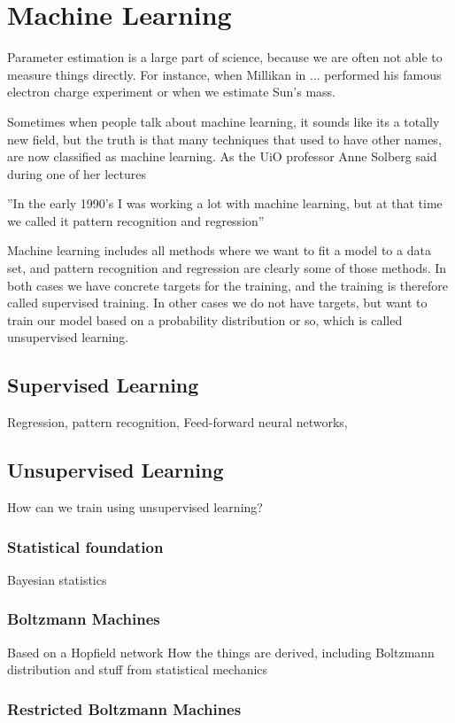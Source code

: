 \chapter{Machine Learning}
Parameter estimation is a large part of science, because we are often not able to measure things directly. For instance, when Millikan in ... performed his famous electron charge experiment or when we estimate Sun's mass. 

Sometimes when people talk about machine learning, it sounds like its a totally new field, but the truth is that many techniques that used to have other names, are now classified as machine learning. As the UiO professor Anne Solberg said during one of her lectures

''In the early 1990's I was working a lot with machine learning, but at that time we called it pattern recognition and regression''

Machine learning includes all methods where we want to fit a model to a data set, and pattern recognition and regression are clearly some of those methods. In both cases we have concrete targets for the training, and the training is therefore called supervised training. In other cases we do not have targets, but want to train our model based on a probability distribution or so, which is called unsupervised learning.

\section{Supervised Learning}
Regression, pattern recognition, 
Feed-forward neural networks, 

\section{Unsupervised Learning}
How can we train using unsupervised learning?

\subsection{Statistical foundation}
Bayesian statistics

\subsection{Boltzmann Machines}
Based on a Hopfield network
How the things are derived, including Boltzmann distribution and stuff from statistical mechanics 

\subsection{Restricted Boltzmann Machines}